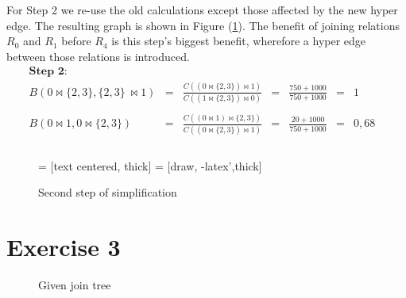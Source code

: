 \documentclass[paper=a4, fontsize=11pt]{scrartcl} %
\numberwithin{equation}{section} %
\numberwithin{figure}{section} %
\numberwithin{table}{section} %
\def\ojoin{\setbox0=\hbox{$\Join$}%
  \rule[+0.095ex]{.3em}{.5pt}\llap{\rule[1.35ex]{0.3em}{0.5pt}}}
\def\rightouterjoin{\mathbin{\Join\mkern-5.8mu\ojoin}}
\begin{document}
For Step 2 we re-use the old calculations except those affected by the new hyper edge. The resulting graph is shown in Figure (\ref{simpl2}). The benefit of joining relations $R_0$ and $R_1$ before $R_4$ is this step's biggest benefit, wherefore a hyper edge between those relations is introduced. 
\begin{align*}
\textbf{Step 2:} \\
B(0 \Join \{2,3\}, \{2,3\}\ \Join 1) &= &\frac{C((0 \Join \{2,3\}) \Join 1)}{C((1 \Join \{2,3\}) \Join 0)}& =& \frac{750+1000}{750+1000} &=& 1& \\ \\
B(0 \Join 1, 0 \Join \{2,3\}) &= &\frac{C((0 \Join 1) \Join \{2,3\})}{C((0 \Join \{2,3\}) \Join 1)}& =& \frac{20+1000}{750+1000} &=& 0,68&\\ \\
\end{align*}

\begin{figure}[H]
	\centering
		 = [text centered, thick]
		 = [draw, -latex',thick]  

	\caption{Second step of simplification}
	  \label{simpl2}
\end{figure}

\section{Exercise 3}
\begin{figure}[H]
\centering
\caption{Given join tree}
  \label{jtree}
\end{figure}
\end{document}
